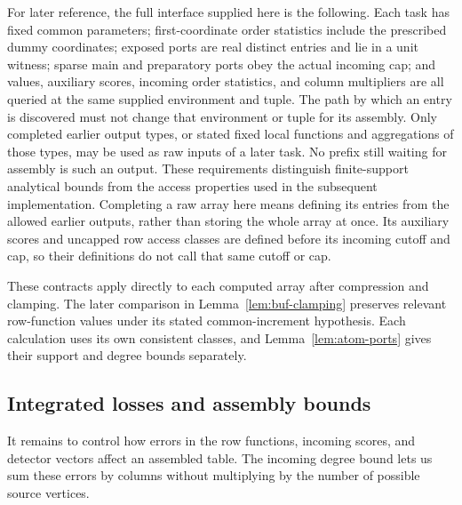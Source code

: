For later reference, the full interface supplied here is the following.
Each task has fixed common parameters; first-coordinate order statistics include the prescribed
dummy coordinates; exposed ports are real distinct entries and lie in a
unit witness; sparse main and preparatory ports obey the actual incoming
cap; and values, auxiliary scores, incoming order statistics, and column multipliers
are all queried at the same supplied environment and tuple.  The path
by which an entry is discovered must not change that environment or tuple
for its assembly.  Only completed earlier output types, or stated fixed local
functions and aggregations of those types, may be used as raw inputs of
a later task.  No prefix still waiting for assembly is such an output.
These requirements distinguish finite-support analytical bounds from
the access properties used in the subsequent implementation.
Completing a raw array here means defining its entries from the allowed
earlier outputs, rather than storing the whole array at once.  Its
auxiliary scores and uncapped row access classes are defined before its incoming
cutoff and cap, so their definitions do not call that same cutoff or cap.

These contracts apply directly to each computed array after compression
and clamping.  The later comparison in Lemma~\ref{lem:buf-clamping}
preserves relevant row-function values under its stated common-increment
hypothesis.  Each calculation uses its own consistent classes,
and Lemma~\ref{lem:atom-ports} gives their support and degree bounds
separately.

\subsection{Integrated losses and assembly bounds}

It remains to control how errors in the row functions, incoming scores,
and detector vectors affect an assembled table.  The incoming degree
bound lets us sum these errors by columns without multiplying by the
number of possible source vertices.

